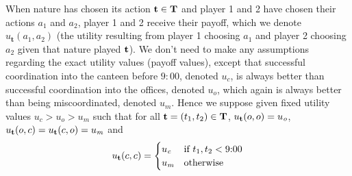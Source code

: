 When nature has chosen its action ${\bf t} \in \bf T$ and player 1 and 2 have chosen their actions $a_1$ and $a_2$, player 1 and 2 receive their payoff, which we denote $u_\mathbf{t}(a_1,a_2)$ (the utility resulting from player 1 choosing $a_1$ and player 2 choosing $a_2$ given that nature played $\bf t$). We don't need to make any assumptions regarding the exact utility values (payoff values), except that successful coordination into the canteen before $9{:}00$, denoted $u_\mathit{c}$, is always better than successful coordination into the offices, denoted $u_\mathit{o}$, which again is always better than being miscoordinated, denoted $u_\mathit{m}$. Hence we suppose given fixed utility values $u_\mathit{c} > u_\mathit{o} > u_\mathit{m}$ such that for all ${\bf t} = (t_1,t_2) \in {\bf T}$,  $u_{\bf t}(o,o) = u_\mathit{o}$, $u_{\bf t}(o,c) = u_{\bf t}(c,o) = u_\mathit{m}$ and 
\[
u_{\bf t}(c,c) = 
\begin{cases}
   u_\mathit{c} &\text{if $t_1,t_2 < 9{:}00$} \\
   u_\mathit{m} &\text{otherwise}
\end{cases}
\]

